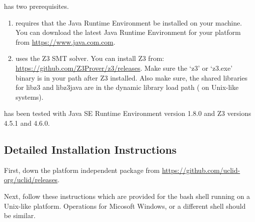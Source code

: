 \uclid{} has two prerequisites. 
\begin{enumerate}
    \item \uclid{} requires that the Java\texttrademark{} Runtime Environment be installed on your machine. You can download the latest Java Runtime Environment for your platform from \url{https://www.java.com.com}. 
\item \uclid{} uses the Z3 SMT solver. You can install Z3 from: \url{https://github.com/Z3Prover/z3/releases}. Make sure the `z3' or `z3.exe' binary is in your path after Z3 installed. Also make sure, the shared libraries for libz3 and libz3java are in the dynamic library load path ( on Unix-like systems).
\end{enumerate}

\uclid{} has been tested with Java\texttrademark{} SE Runtime Environment version 1.8.0 and Z3 versions 4.5.1 and 4.6.0.

\subsection{Detailed Installation Instructions}

First, down the platform independent package from \url{https://github.com/uclid-org/uclid/releases}.

Next, follow these instructions which are provided for the bash shell running on a Unix-like platform. Operations for Micosoft Windows, or a different shell should be similar.

